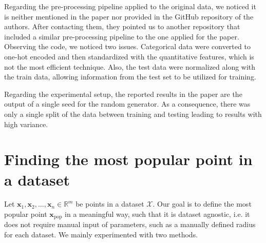 Regarding the pre-processing pipeline applied to the original data, we noticed it is neither mentioned in the paper nor provided in the GitHub repository of the authors. After contacting them, they pointed us to another repository that included a similar pre-processing pipeline to the one applied for the paper. Observing the code, we noticed two issues. Categorical data were converted to one-hot encoded and then standardized with the quantitative features, which is not the most efficient technique. Also, the test data were normalized along with the train data, allowing information from the test set to be utilized for training.

Regarding the experimental setup, the reported results in the paper are the output of a single seed for the random generator. As a consequence, there was only a single split of the data between training and testing leading to results with high variance.

\section{Finding the most popular point in a dataset}
\label{app:nraa}
Let $\mathbf{x}_1, \mathbf{x}_2, \dots, \mathbf{x}_n \in \mathbb{R}^m$ be points in a dataset $\mathcal{X}$. Our goal is to define the most popular point $\mathbf{x}_{\mathrm{pop}}$ in a meaningful way, such that it is dataset agnostic, i.e. it does not require manual input of parameters, such as a manually defined radius for each dataset. We mainly experimented with two methods.

